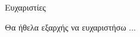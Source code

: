 \begin{center}
{\LARGE Ευχαριστίες}\\[1cm]
\end{center}

\noindent Θα ήθελα εξαρχής να ευχαριστήσω ...


